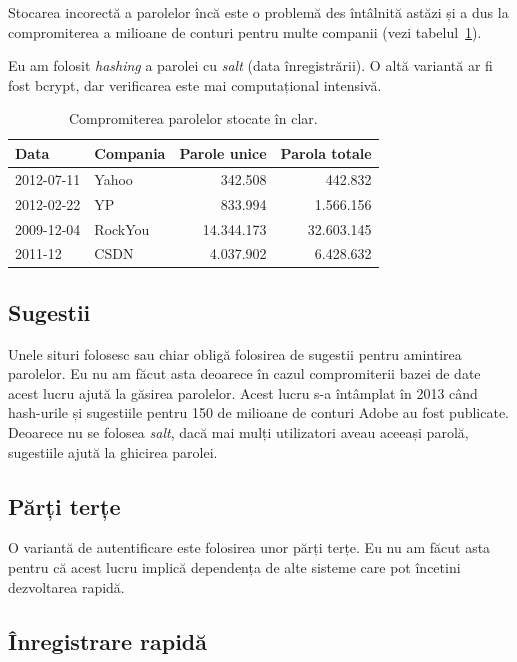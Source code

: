 \documentclass[a4wide,12pt]{report}
\newcommand{\eng}[1]{\emph{#1}} %
\begin{document}
Stocarea incorectă a parolelor încă este o problemă des întâlnită astăzi și a
dus la compromiterea a milioane de conturi pentru multe companii (vezi
tabelul~\ref{parole}).

Eu am folosit \eng{hashing} a parolei cu \eng{salt} (data înregistrării). O altă
variantă ar fi fost bcrypt, dar verificarea este mai computațional intensivă.

\begin{table}[hb]
\begin{center}
\begin{tabular}{l l r r}
Data & Compania & Parole unice & Parola totale \\
\hline
2012-07-11 & Yahoo & 342.508 & 442.832 \\
2012-02-22 & YP & 833.994 & 1.566.156 \\
2009-12-04 & RockYou & 14.344.173 & 32.603.145 \\
2011-12 & CSDN & 4.037.902 & 6.428.632 \\
\end{tabular}
\end{center}
\caption{Compromiterea parolelor stocate în clar\cite{passleak}.}
\label{parole}
\end{table}

\subsection{Sugestii}

Unele situri folosesc sau chiar obligă folosirea de sugestii pentru amintirea
parolelor. Eu nu am făcut asta deoarece în cazul compromiterii bazei de date
acest lucru ajută la găsirea parolelor. Acest lucru s-a întâmplat în 2013 când
hash-urile și sugestiile pentru 150 de milioane de conturi Adobe au fost
publicate. Deoarece nu se folosea \eng{salt}, dacă mai mulți utilizatori aveau
aceeași parolă, sugestiile ajută la ghicirea parolei.

\subsection{Părți terțe}

O variantă de autentificare este folosirea unor părți terțe. Eu nu am făcut asta
pentru că acest lucru implică dependența de alte sisteme care pot încetini
dezvoltarea rapidă.

\subsection{Înregistrare rapidă}
\end{document}
